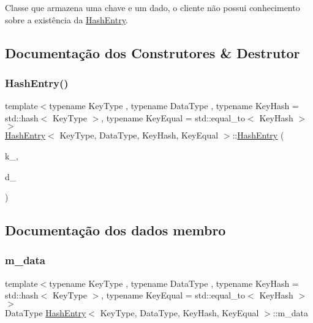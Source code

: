 Classe que armazena uma chave e um dado, o cliente não possui conhecimento sobre a existência da \hyperlink{classHashEntry}{Hash\+Entry}. 

\subsection{Documentação dos Construtores \& Destrutor}
\mbox{\label{classHashEntry_a1247b00f740887cdaeb1c77c2fa05225}} 
\subsubsection{\texorpdfstring{Hash\+Entry()}{HashEntry()}}
{\footnotesize\ttfamily template$<$typename Key\+Type , typename Data\+Type , typename Key\+Hash  = std\+::hash$<$ Key\+Type $>$, typename Key\+Equal  = std\+::equal\+\_\+to$<$ Key\+Hash $>$$>$ \\
\hyperlink{classHashEntry}{Hash\+Entry}$<$ Key\+Type, Data\+Type, Key\+Hash, Key\+Equal $>$\+::\hyperlink{classHashEntry}{Hash\+Entry} (\begin{DoxyParamCaption}\item[{Key\+Type}]{k\+\_\+,  }\item[{Data\+Type}]{d\+\_\+ }\end{DoxyParamCaption})\hspace{0.3cm}{\ttfamily [inline]}}



\subsection{Documentação dos dados membro}
\mbox{\label{classHashEntry_aad378adf91322196c55be012d2fb2371}} 
\subsubsection{\texorpdfstring{m\+\_\+data}{m\_data}}
{\footnotesize\ttfamily template$<$typename Key\+Type , typename Data\+Type , typename Key\+Hash  = std\+::hash$<$ Key\+Type $>$, typename Key\+Equal  = std\+::equal\+\_\+to$<$ Key\+Hash $>$$>$ \\
Data\+Type \hyperlink{classHashEntry}{Hash\+Entry}$<$ Key\+Type, Data\+Type, Key\+Hash, Key\+Equal $>$\+::m\+\_\+data}


